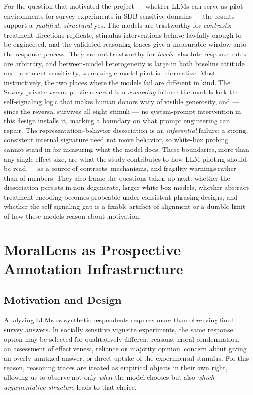 \documentclass[14pt,a4paper]{extarticle}
\begin{document}
For the question that motivated the project --- whether LLMs can serve as pilot environments for survey experiments in SDB-sensitive domains --- the results support a \emph{qualified, structural} yes. The models are trustworthy for \emph{contrasts}: treatment directions replicate, stimulus interventions behave lawfully enough to be engineered, and the validated reasoning traces give a measurable window onto the response process. They are not trustworthy for \emph{levels}: absolute response rates are arbitrary, and between-model heterogeneity is large in both baseline attitude and treatment sensitivity, so no single-model pilot is informative. Most instructively, the two places where the models fail are different in kind. The Savary private-versus-public reversal is a \emph{reasoning} failure: the models lack the self-signaling logic that makes human donors wary of visible generosity, and --- since the reversal survives all eight stimuli --- no system-prompt intervention in this design installs it, marking a boundary on what prompt engineering can repair. The representation--behavior dissociation is an \emph{inferential} failure: a strong, consistent internal signature need not move behavior, so white-box probing cannot stand in for measuring what the model does. These boundaries, more than any single effect size, are what the study contributes to how LLM piloting should be read --- as a source of contrasts, mechanisms, and fragility warnings rather than of numbers. They also frame the questions taken up next: whether the dissociation persists in non-degenerate, larger white-box models, whether abstract treatment encoding becomes probeable under consistent-phrasing designs, and whether the self-signaling gap is a fixable artifact of alignment or a durable limit of how these models reason about motivation.


\section{MoralLens as Prospective Annotation Infrastructure}

\subsection{Motivation and Design}

Analyzing LLMs as synthetic respondents requires more than observing final
survey answers. In socially sensitive vignette experiments, the same response
option may be selected for qualitatively different reasons: moral condemnation,
an assessment of effectiveness, reliance on majority opinion, concern about
giving an overly sanitized answer, or direct uptake of the experimental stimulus.
For this reason, reasoning traces are treated as empirical objects in their own
right, allowing us to observe not only \emph{what} the model chooses but also
\emph{which argumentative structure} leads to that choice.
\end{document}
